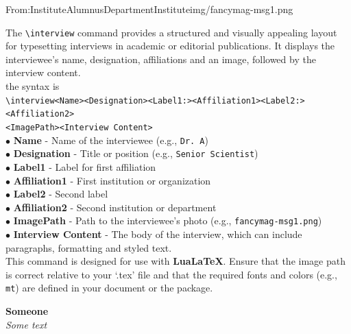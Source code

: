 \documentclass[10pt,twoside]{article}
\begin{document}
{   {From:}{Institute}{Alumnus}{Department}{Institute}{img/fancymag-msg1.png}{
  		The \texttt{\textbackslash interview} command provides a structured and visually appealing layout for typesetting interviews in academic or editorial publications. It displays the interviewee's name, designation, affiliations and an image, followed by the interview content.\\
  		the syntax is \\
  		\texttt{\textbackslash interview{<Name>}{<Designation>}{<Label1:>}{<Affiliation1>}{<Label2:>}{<Affiliation2>}\\{<ImagePath>}{<Interview Content>}}\\
  		$\bullet$ \textbf{Name} - Name of the interviewee (e.g., \texttt{Dr. A})\\
  		$\bullet$ \textbf{Designation} - Title or position (e.g., \texttt{Senior Scientist})\\
  		$\bullet$ \textbf{Label1} - Label for first affiliation\\
  		$\bullet$ \textbf{Affiliation1} - First institution or organization\\
  		$\bullet$ \textbf{Label2} - Second label\\
  		$\bullet$ \textbf{Affiliation2} - Second institution or department\\
  		$\bullet$ \textbf{ImagePath} - Path to the interviewee's photo (e.g., \texttt{fancymag-msg1.png})\\
  		$\bullet$ \textbf{Interview Content} - The body of the interview, which can include paragraphs, formatting and styled text.\\
  		\noindent This command is designed for use with \textbf{LuaLaTeX}. Ensure that the image path is correct relative to your `.tex' file and that the required fonts and colors (e.g., \texttt{mt}) are defined in your document or the package.
  		
  		\begin{flushright}
  			\large{\textbf{Someone}}\\
  			\textcolor{mt}{\textit{Some text}}
  		\end{flushright}
  		}
  	

  
}
\end{document}
